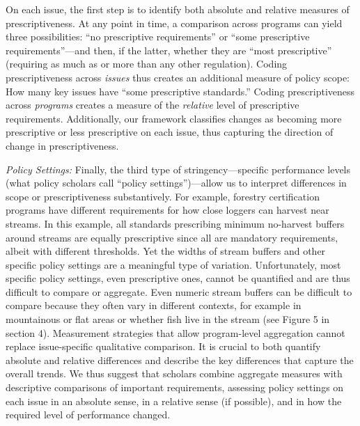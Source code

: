 \documentclass[
      12pt,
            Review ]{article}
\begin{document}
On each issue, the first step is to identify both absolute and relative measures of prescriptiveness. At any point in time, a comparison across programs can yield three possibilities: ``no prescriptive requirements'' or ``some prescriptive requirements''---and then, if the latter, whether they are ``most prescriptive'' (requiring as much as or more than any other regulation). Coding prescriptiveness across \emph{issues} thus creates an additional measure of policy scope: How many key issues have ``some prescriptive standards.'' Coding prescriptiveness across \emph{programs} creates a measure of the \emph{relative} level of prescriptive requirements. Additionally, our framework classifies changes as becoming more prescriptive or less prescriptive on each issue, thus capturing the direction of change in prescriptiveness.



\emph{Policy Settings:} Finally, the third type of stringency---specific performance levels (what policy scholars call ``policy settings'')---allow us to interpret differences in scope or prescriptiveness substantively. For example, forestry certification programs have different requirements for how close loggers can harvest near streams. In this example, all standards prescribing minimum no-harvest buffers around streams are equally prescriptive since all are mandatory requirements, albeit with different thresholds. Yet the widths of stream buffers and other specific policy settings are a meaningful type of variation. Unfortunately, most specific policy settings, even prescriptive ones, cannot be quantified and are thus difficult to compare or aggregate. Even numeric stream buffers can be difficult to compare because they often vary in different contexts, for example in mountainous or flat areas or whether fish live in the stream (see Figure 5 in section 4). Measurement strategies that allow program-level aggregation cannot replace issue-specific qualitative comparison. It is crucial to both quantify absolute and relative differences and describe the key differences that capture the overall trends. We thus suggest that scholars combine aggregate measures with descriptive comparisons of important requirements, assessing policy settings on each issue in an absolute sense, in a relative sense (if possible), and in how the required level of performance changed.
\end{document}
